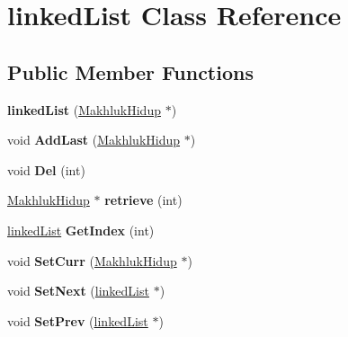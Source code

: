 \hypertarget{classlinked_list}{}\section{linked\+List Class Reference}
\label{classlinked_list}
\subsection*{Public Member Functions}
\begin{DoxyCompactItemize}
\item 
{\bfseries linked\+List} (\hyperlink{class_makhluk_hidup}{Makhluk\+Hidup} $\ast$)\hypertarget{classlinked_list_a48697c9dde287ec065bd968cdd39b7ea}{}\label{classlinked_list_a48697c9dde287ec065bd968cdd39b7ea}

\item 
void {\bfseries Add\+Last} (\hyperlink{class_makhluk_hidup}{Makhluk\+Hidup} $\ast$)\hypertarget{classlinked_list_abfccc5a0dfc257fea6dffd6717f935a5}{}\label{classlinked_list_abfccc5a0dfc257fea6dffd6717f935a5}

\item 
void {\bfseries Del} (int)\hypertarget{classlinked_list_a680ba19e4eaf4f3b923de498a76a9768}{}\label{classlinked_list_a680ba19e4eaf4f3b923de498a76a9768}

\item 
\hyperlink{class_makhluk_hidup}{Makhluk\+Hidup} $\ast$ {\bfseries retrieve} (int)\hypertarget{classlinked_list_ad810b23d27e11a44dc551ff7d507dc4e}{}\label{classlinked_list_ad810b23d27e11a44dc551ff7d507dc4e}

\item 
\hyperlink{classlinked_list}{linked\+List} {\bfseries Get\+Index} (int)\hypertarget{classlinked_list_a2ab2f205ede0558c7a74f0a72587bac8}{}\label{classlinked_list_a2ab2f205ede0558c7a74f0a72587bac8}

\item 
void {\bfseries Set\+Curr} (\hyperlink{class_makhluk_hidup}{Makhluk\+Hidup} $\ast$)\hypertarget{classlinked_list_a3db922e69a1a03c95bbf0f966920462a}{}\label{classlinked_list_a3db922e69a1a03c95bbf0f966920462a}

\item 
void {\bfseries Set\+Next} (\hyperlink{classlinked_list}{linked\+List} $\ast$)\hypertarget{classlinked_list_a2dcd8a48e8fe874b8f1847b52cb4950f}{}\label{classlinked_list_a2dcd8a48e8fe874b8f1847b52cb4950f}

\item 
void {\bfseries Set\+Prev} (\hyperlink{classlinked_list}{linked\+List} $\ast$)\hypertarget{classlinked_list_a73393452a59e9a4d9958ca9f301e5ee2}{}\label{classlinked_list_a73393452a59e9a4d9958ca9f301e5ee2}


\end{DoxyCompactItemize}
